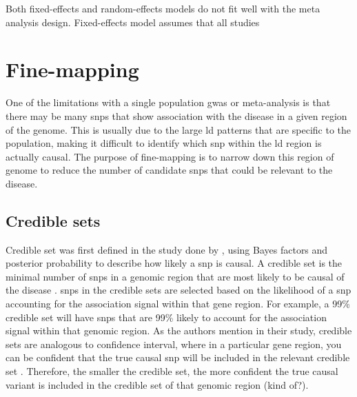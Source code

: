 Both fixed-effects and random-effects models do not fit well with the meta analysis design.
Fixed-effects model assumes that all studies 











\section{Fine-mapping}
\label{sec:fine_mapping}

One of the limitations with a single population \gls{gwas} or meta-analysis is that there may be many \glspl{snp} that show association with the disease in a given region of the genome.
This is usually due to the large \gls{ld} patterns that are specific to the population, making it difficult to identify which \gls{snp} within the \gls{ld} region is actually causal.
The purpose of fine-mapping is to narrow down this region of genome to reduce the number of candidate \glspl{snp} that could be relevant to the disease.

\subsection{Credible sets}
\label{sub:credible_sets}

Credible set was first defined in the study done by \citet{wtccc2012}, using Bayes factors and posterior probability to describe how likely a \gls{snp} is causal.
A credible set is the minimal number of \glspl{snp} in a genomic region that are most likely to be causal of the disease \citep{wtccc2012}.
\glspl{snp} in the credible sets are selected based on the likelihood of a \gls{snp} accounting for the association signal within that gene region.
For example, a 99\% credible set will have \glspl{snp} that are 99\% likely to account for the association signal within that genomic region.
As the authors mention in their study, credible sets are analogous to confidence interval, where in a particular gene region, you can be confident that the true causal \gls{snp} will be included in the relevant credible set \citep{wtccc2012}.
Therefore, the smaller the credible set, the more confident the true causal variant is included in the credible set of that genomic region (kind of?).

